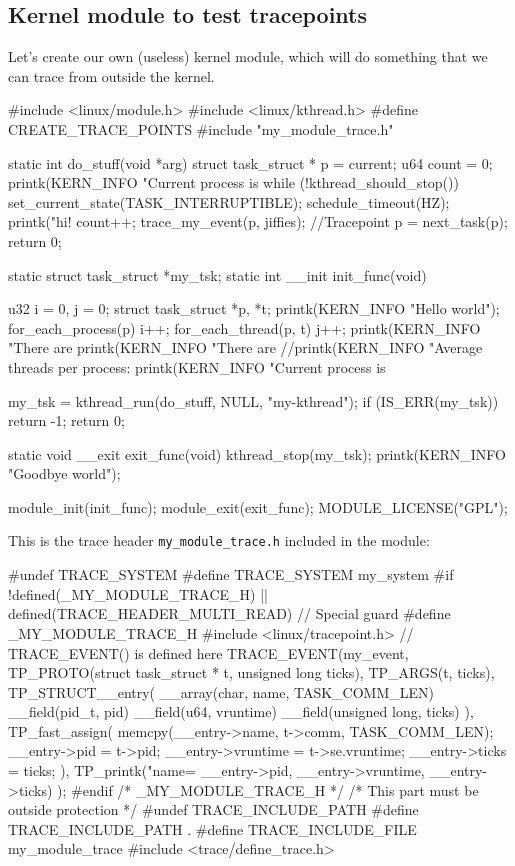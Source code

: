 \documentclass[10pt]{book}
\begin{document}
\subsection{Kernel module to test tracepoints}
Let's create our own (useless) kernel module, which will do something that we can trace from outside the kernel.
\begin{code}
#include <linux/module.h>
#include <linux/kthread.h>
#define CREATE_TRACE_POINTS
#include "my_module_trace.h"

static int do_stuff(void *arg){
	struct task_struct * p = current;
	u64 count = 0;
	printk(KERN_INFO "Current process is %
	while (!kthread_should_stop()){
		set_current_state(TASK_INTERRUPTIBLE);
		schedule_timeout(HZ);
		printk("hi! %
		count++;
		trace_my_event(p, jiffies); //Tracepoint
		p = next_task(p);
	}
	return 0;
}

static struct task_struct *my_tsk;
static int __init init_func(void){
	u32 i = 0, j = 0;
	struct task_struct *p, *t;
	printk(KERN_INFO "Hello world\n");
	for_each_process(p){
		i++;
		for_each_thread(p, t){
			j++;
		}
	}
	printk(KERN_INFO "There are %
	printk(KERN_INFO "There are %
	//printk(KERN_INFO "Average threads per process: %
	printk(KERN_INFO "Current process is %
	
	my_tsk = kthread_run(do_stuff, NULL, "my-kthread");
	if (IS_ERR(my_tsk))
		return -1;
	return 0;
}

static void __exit exit_func(void){
	kthread_stop(my_tsk);
	printk(KERN_INFO "Goodbye world\n");
}

module_init(init_func);
module_exit(exit_func);
MODULE_LICENSE("GPL");
\end{code}
This is the trace header \verb|my_module_trace.h| included in the module:
\begin{code}
#undef TRACE_SYSTEM
#define TRACE_SYSTEM my_system
#if !defined(_MY_MODULE_TRACE_H) || defined(TRACE_HEADER_MULTI_READ) // Special guard
#define _MY_MODULE_TRACE_H
#include <linux/tracepoint.h> // TRACE_EVENT() is defined here
TRACE_EVENT(my_event,
	TP_PROTO(struct task_struct * t, unsigned long ticks),
	TP_ARGS(t, ticks),
	TP_STRUCT__entry(
		__array(char, name, TASK_COMM_LEN)
		__field(pid_t, pid)
		__field(u64, vruntime)
		__field(unsigned long, ticks)
	),
	TP_fast_assign(
		memcpy(__entry->name, t->comm, TASK_COMM_LEN);
		__entry->pid	= t->pid;
		__entry->vruntime = t->se.vruntime;
		__entry->ticks = ticks;
	),
	TP_printk("name=%
	__entry->pid, __entry->vruntime, __entry->ticks)
);
#endif /* _MY_MODULE_TRACE_H */
/* This part must be outside protection */
#undef TRACE_INCLUDE_PATH
#define TRACE_INCLUDE_PATH .
#define TRACE_INCLUDE_FILE my_module_trace
#include <trace/define_trace.h>
\end{code}
\end{document}
